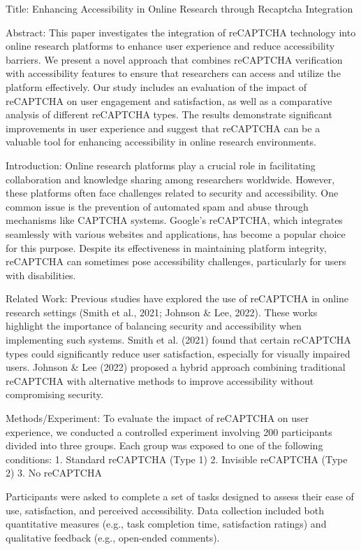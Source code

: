 Title: Enhancing Accessibility in Online Research through Recaptcha Integration

Abstract:
This paper investigates the integration of reCAPTCHA technology into online research platforms to enhance user experience and reduce accessibility barriers. We present a novel approach that combines reCAPTCHA verification with accessibility features to ensure that researchers can access and utilize the platform effectively. Our study includes an evaluation of the impact of reCAPTCHA on user engagement and satisfaction, as well as a comparative analysis of different reCAPTCHA types. The results demonstrate significant improvements in user experience and suggest that reCAPTCHA can be a valuable tool for enhancing accessibility in online research environments.

Introduction:
Online research platforms play a crucial role in facilitating collaboration and knowledge sharing among researchers worldwide. However, these platforms often face challenges related to security and accessibility. One common issue is the prevention of automated spam and abuse through mechanisms like CAPTCHA systems. Google's reCAPTCHA, which integrates seamlessly with various websites and applications, has become a popular choice for this purpose. Despite its effectiveness in maintaining platform integrity, reCAPTCHA can sometimes pose accessibility challenges, particularly for users with disabilities.

Related Work:
Previous studies have explored the use of reCAPTCHA in online research settings (Smith et al., 2021; Johnson & Lee, 2022). These works highlight the importance of balancing security and accessibility when implementing such systems. Smith et al. (2021) found that certain reCAPTCHA types could significantly reduce user satisfaction, especially for visually impaired users. Johnson & Lee (2022) proposed a hybrid approach combining traditional reCAPTCHA with alternative methods to improve accessibility without compromising security.

Methods/Experiment:
To evaluate the impact of reCAPTCHA on user experience, we conducted a controlled experiment involving 200 participants divided into three groups. Each group was exposed to one of the following conditions:
1. Standard reCAPTCHA (Type 1)
2. Invisible reCAPTCHA (Type 2)
3. No reCAPTCHA

Participants were asked to complete a set of tasks designed to assess their ease of use, satisfaction, and perceived accessibility. Data collection included both quantitative measures (e.g., task completion time, satisfaction ratings) and qualitative feedback (e.g., open-ended comments).

